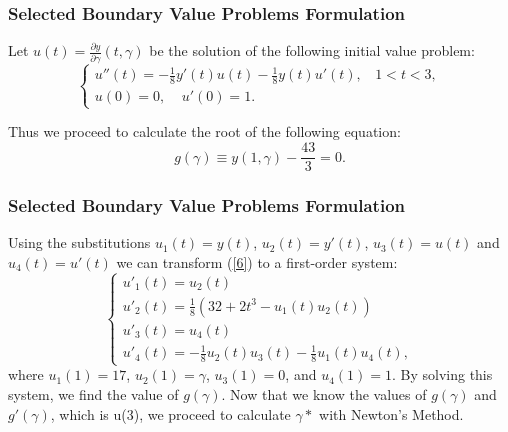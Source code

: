 \documentclass{beamer}
\begin{document}
\begin{frame}
\frametitle{Selected Boundary Value Problems Formulation} %
Let $u(t)=\frac{\partial y}{\partial \gamma}(t, \gamma)$ be the solution of the following initial value problem:
    \begin{equation}\label{7}
        \begin{cases}
            u''(t)=-\frac{1}{8}y'(t)u(t) -\frac{1}{8}y(t)u'(t),\ \ \ \ 1 < t < 3, \\
            u(0)=0, \ \ \ \ \ u'(0)=1.
        \end{cases}
    \end{equation}
    
Thus we proceed to calculate the root of the following equation:
\begin{equation}\label{8}
g(\gamma)\equiv y(1,\gamma)-\frac{43}{3}=0.
\end{equation}
\end{frame}
\begin{frame}
\frametitle{Selected Boundary Value Problems Formulation} %
Using the substitutions $u_1(t)=y(t)$, $u_2(t)=y'(t)$, $u_3(t)=u(t)$ and $u_4(t)=u'(t)$ we can transform (\ref{6}) to a first-order system:
\begin{equation}\label{9}
    \begin{cases}
        u'_1(t)=u_2(t)\\
        u'_2(t)=\frac{1}{8}(32+2t^3-u_1(t)u_2(t))\\
        u'_3(t)=u_4(t)\\
        u'_4(t)=-\frac{1}{8}u_2(t)u_3(t) -\frac{1}{8}u_1(t)u_4(t),
    \end{cases}
\end{equation}
where $u_1(1)=17$, $u_2(1)=\gamma$, $u_3(1)=0$, and $u_4(1)=1$.
By solving this system, we find the value of $g(\gamma)$. Now that we know the values of $g(\gamma)$ and $g'(\gamma)$, which is u(3), we proceed to calculate $\gamma*$ with Newton's Method.
\end{frame}
\end{document}
